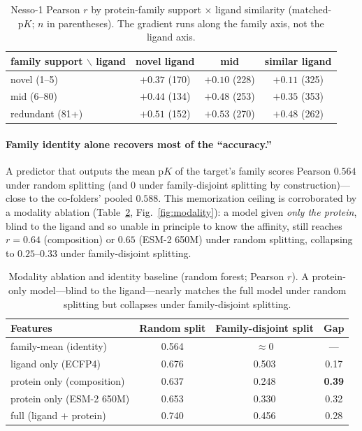 \documentclass[11pt]{article}
\begin{document}
\begin{table}[t]
\centering\small
\caption{Nesso-1 Pearson $r$ by protein-family support $\times$ ligand similarity
(matched-$\mathrm{p}K$; $n$ in parentheses). The gradient runs along the family axis, not the
ligand axis.}
\label{tab:2d}
\begin{tabular}{lccc}
\toprule
family support $\backslash$ ligand & novel ligand & mid & similar ligand \\
\midrule
novel (1--5)     & $+0.37$ (170) & $+0.10$ (228) & $+0.11$ (325) \\
mid (6--80)      & $+0.44$ (134) & $+0.48$ (253) & $+0.35$ (353) \\
redundant (81+)  & $+0.51$ (152) & $+0.53$ (270) & $+0.48$ (262) \\
\bottomrule
\end{tabular}
\end{table}

\paragraph{Family identity alone recovers most of the ``accuracy.''} A predictor that outputs the
mean $\mathrm{p}K$ of the target's family scores Pearson $\mathbf{0.564}$ under random splitting
(and $0$ under family-disjoint splitting by construction)---close to the co-folders' pooled $0.588$.
This memorization ceiling is corroborated by a modality ablation (Table~\ref{tab:modality},
Fig.~\ref{fig:modality}): a model given \emph{only the protein}, blind to the ligand and so unable
in principle to know the affinity, still reaches $r=0.64$ (composition) or $0.65$ (ESM-2 650M)
under random splitting, collapsing to $0.25$--$0.33$ under family-disjoint splitting.

\begin{table}[t]
\centering\small
\caption{Modality ablation and identity baseline (random forest; Pearson $r$). A protein-only
model---blind to the ligand---nearly matches the full model under random splitting but collapses
under family-disjoint splitting.}
\label{tab:modality}
\begin{tabular}{lccc}
\toprule
Features & Random split & Family-disjoint split & Gap \\
\midrule
family-mean (identity)       & 0.564 & $\approx 0$ & --- \\
ligand only (ECFP4)          & 0.676 & 0.503 & 0.17 \\
protein only (composition)   & 0.637 & 0.248 & \textbf{0.39} \\
protein only (ESM-2 650M)    & 0.653 & 0.330 & 0.32 \\
full (ligand $+$ protein)    & 0.740 & 0.456 & 0.28 \\
\bottomrule
\end{tabular}
\end{table}
\end{document}
